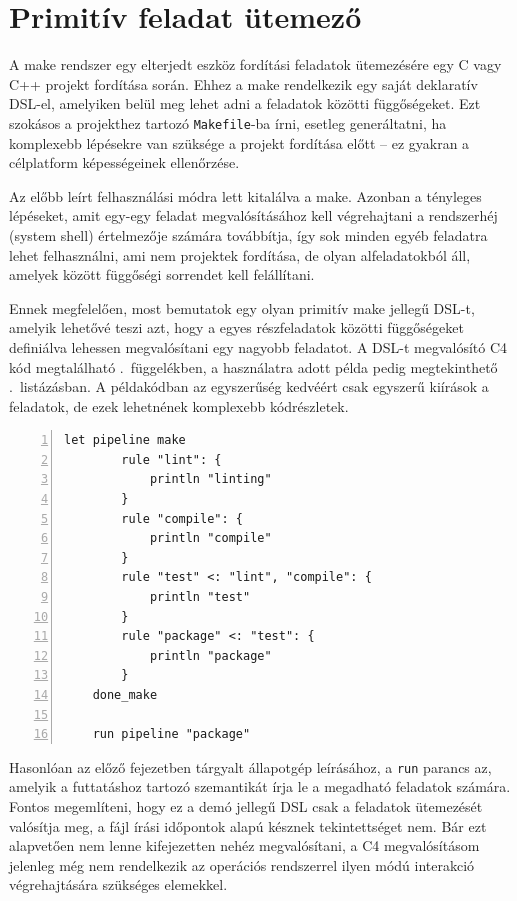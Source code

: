 \section{Primitív feladat ütemező}\label{sec:uses:make}

A make rendszer egy elterjedt eszköz fordítási feladatok ütemezésére egy C vagy C++ projekt fordítása során.
Ehhez a make rendelkezik egy saját deklaratív \gls{DSL}-el, amelyiken belül meg lehet adni a feladatok közötti függőségeket.
Ezt szokásos a projekthez tartozó {\tt Makefile}-ba írni, esetleg generáltatni, ha komplexebb lépésekre van szüksége a projekt fordítása előtt -- ez gyakran a célplatform képességeinek ellenőrzése.

Az előbb leírt felhasználási módra lett kitalálva a make.
Azonban a tényleges lépéseket, amit egy-egy feladat megvalósításához kell végrehajtani a rendszerhéj (system shell) értelmezője számára továbbítja, így sok minden egyéb feladatra lehet felhasználni, ami nem projektek fordítása, de olyan alfeladatokból áll, amelyek között függőségi sorrendet kell felállítani.

Ennek megfelelően, most bemutatok egy olyan primitív make jellegű \gls{DSL}-t, amelyik lehetővé teszi azt, hogy a egyes részfeladatok közötti függőségeket definiálva lehessen megvalósítani egy nagyobb feladatot.
A \gls{DSL}-t megvalósító C4 kód megtalálható .~függelékben, a használatra adott példa pedig megtekinthető .~listázásban.
A példakódban az egyszerűség kedvéért csak egyszerű kiírások a feladatok, de ezek lehetnének komplexebb kódrészletek.

\begin{lstlisting}[gobble=4,numbers=left,caption={C4 make jellegű \gls{DSL} használati példa},label=lst:ex-make]
    let pipeline make
        rule "lint": {
            println "linting"
        }
        rule "compile": {
            println "compile"
        }
        rule "test" <: "lint", "compile": {
            println "test"
        }
        rule "package" <: "test": {
            println "package"
        }
    done_make

    run pipeline "package"
\end{lstlisting}

Hasonlóan az előző fejezetben tárgyalt állapotgép leírásához, a {\tt run} parancs az, amelyik a futtatáshoz tartozó szemantikát írja le a megadható feladatok számára.
Fontos megemlíteni, hogy ez a demó jellegű \gls{DSL} csak a feladatok ütemezését valósítja meg, a fájl írási időpontok alapú késznek tekintettséget nem.
Bár ezt alapvetően nem lenne kifejezetten nehéz megvalósítani, a C4 megvalósításom jelenleg még nem rendelkezik az operációs rendszerrel ilyen módú interakció végrehajtására szükséges elemekkel.





